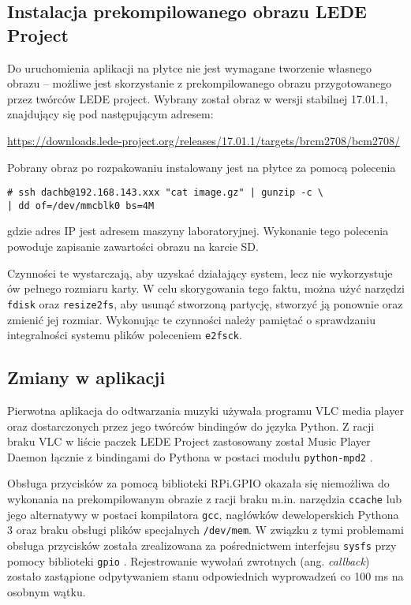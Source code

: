 \documentclass[10pt,a4paper]{article}
\begin{document}
\subsection{Instalacja prekompilowanego obrazu LEDE Project}

Do uruchomienia aplikacji na płytce nie jest wymagane tworzenie własnego obrazu -- możliwe jest
skorzystanie z prekompilowanego obrazu przygotowanego przez twórców LEDE project. Wybrany został
obraz w wersji stabilnej 17.01.1, znajdujący się pod następującym adresem:

\url{https://downloads.lede-project.org/releases/17.01.1/targets/brcm2708/bcm2708/}

Pobrany obraz po rozpakowaniu instalowany jest na płytce za pomocą polecenia

\begin{lstlisting}
# ssh dachb@192.168.143.xxx "cat image.gz" | gunzip -c \
| dd of=/dev/mmcblk0 bs=4M
\end{lstlisting}

gdzie adres IP jest adresem maszyny laboratoryjnej. Wykonanie tego polecenia powoduje zapisanie
zawartości obrazu na karcie SD.

Czynności te wystarczają, aby uzyskać działający system, lecz nie wykorzystuje ów pełnego rozmiaru
karty. W celu skorygowania tego faktu, można użyć narzędzi \texttt{fdisk} oraz \texttt{resize2fs},
aby usunąć stworzoną partycję, stworzyć ją ponownie oraz zmienić jej rozmiar. Wykonując te czynności
należy pamiętać o sprawdzaniu integralności systemu plików poleceniem \texttt{e2fsck}.

\subsection{Zmiany w aplikacji}

Pierwotna aplikacja do odtwarzania muzyki używała programu VLC media player oraz dostarczonych
przez jego twórców bindingów do języka Python. Z racji braku VLC w liście paczek LEDE Project
zastosowany został Music Player Daemon \cite{mpd} łącznie z bindingami do Pythona w postaci
modułu \texttt{python-mpd2} \cite{python-mpd2}.

Obsługa przycisków za pomocą biblioteki RPi.GPIO okazała się niemożliwa do wykonania
na prekompilowanym obrazie z racji braku m.in. narzędzia \texttt{ccache} lub jego alternatywy
w postaci kompilatora \texttt{gcc}, nagłówków deweloperskich Pythona 3 oraz braku obsługi plików
specjalnych \texttt{/dev/mem}. W związku z tymi problemami obsługa przycisków została zrealizowana
za pośrednictwem interfejsu \texttt{sysfs} przy pomocy biblioteki \texttt{gpio} \cite{gpio}.
Rejestrowanie wywołań zwrotnych (ang. \emph{callback}) zostało zastąpione odpytywaniem stanu
odpowiednich wyprowadzeń co 100 ms na osobnym wątku.
\end{document}
